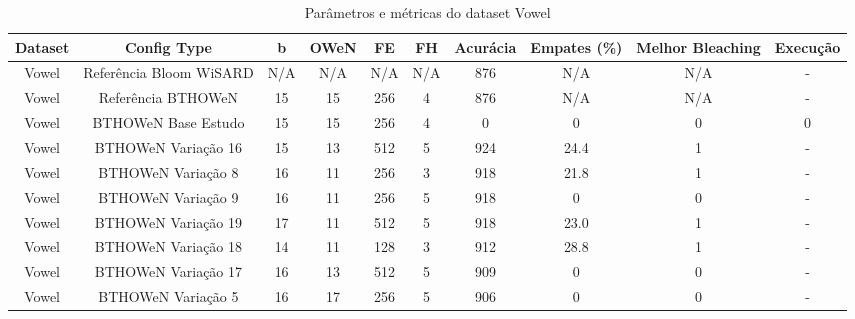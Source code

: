 \documentclass{article}
\begin{document}
\begin{longtable}{|c|c|c|c|c|c|c|c|c|c|}
\caption{Parâmetros e métricas do dataset Vowel} \\
\hline
\textbf{Dataset} & \textbf{Config Type} & \textbf{b} & \textbf{OWeN} & \textbf{FE} & \textbf{FH} & \textbf{Acurácia} & \textbf{Empates (\%)} & \textbf{Melhor Bleaching} & \textbf{Execução} \\
\hline
Vowel & Referência Bloom WiSARD & N/A & N/A & N/A & N/A & 876 & N/A & N/A & - \\
\hline
Vowel & Referência BTHOWeN & 15 & 15 & 256 & 4 & 876 & N/A & N/A & - \\
\hline
Vowel & BTHOWeN Base Estudo & 15 & 15 & 256 & 4 & 0 & 0 & 0 & 0 \\
\hline
Vowel & BTHOWeN Variação 16 & 15 & 13 & 512 & 5 & 924 & 24.4 & 1 & - \\
\hline
Vowel & BTHOWeN Variação 8 & 16 & 11 & 256 & 3 & 918 & 21.8 & 1 & - \\
\hline
Vowel & BTHOWeN Variação 9 & 16 & 11 & 256 & 5 & 918 & 0 & 0 & - \\
\hline
Vowel & BTHOWeN Variação 19 & 17 & 11 & 512 & 5 & 918 & 23.0 & 1 & - \\
\hline
Vowel & BTHOWeN Variação 18 & 14 & 11 & 128 & 3 & 912 & 28.8 & 1 & - \\
\hline
Vowel & BTHOWeN Variação 17 & 16 & 13 & 512 & 5 & 909 & 0 & 0 & - \\
\hline
Vowel & BTHOWeN Variação 5 & 16 & 17 & 256 & 5 & 906 & 0 & 0 & - \\
\hline
\end{longtable}
\end{document}
